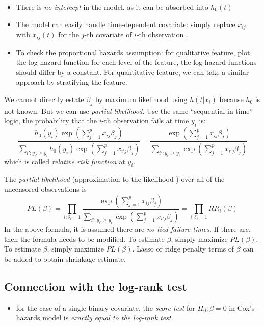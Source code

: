 \documentclass[
  letterpaper,
  DIV=11,
  numbers=noendperiod]{scrreprt}
\providecommand{\tightlist}{%
  \setlength{\itemsep}{0pt}\setlength{\parskip}{0pt}}\usepackage{longtable,booktabs,array}
\begin{document}
\begin{itemize}
\tightlist
\item
  There is \emph{no intercept} in the model, as it can be absorbed into
  \(h_0(t)\)
\item
  The model can easily handle time-dependent covariate: simply replace
  \(x_{ij}\) with \(x_{ij}(t)\) for the \(j\)-th covariate of \(i\)-th
  observation .
\item
  To check the proportional hazards assumption: for qualitative feature,
  plot the log hazard function for each level of the feature, the log
  hazard functions should differ by a constant. For quantitative
  feature, we can take a similar approach by stratifying the feature.
\end{itemize}

We cannot directly estate \(\beta_j\) by maximum likelihood using
\(h(t|x_i)\) because \(h_0\) is not known. But we can use \emph{partial
likelihood}. Use the same ``sequential in time'' logic, the probability
that the \(i\)-th observation fails at time \(y_i\) is: \[
\frac{h_0(y_i)\exp \left(\sum_{j=1}^p x_{ij}\beta_j \right)}{\sum_{i':y_{i'}\ge y_i} h_0(y_i) \exp\left(  \sum_{j=1}^p x_{i'j}\beta_j \right)}=\frac{\exp \left(\sum_{j=1}^p x_{ij}\beta_j \right)}{\sum_{i':y_{i'}\ge y_i} \exp\left(  \sum_{j=1}^p x_{i'j}\beta_j \right)}
\] which is called \emph{relative risk function} at \(y_i\).

The \emph{partial likelihood} (approximation to the likelihood ) over
all of the uncensored observations is \[
PL(\beta) = \prod _{i:\delta_i = 1} \frac{\exp \left(\sum_{j=1}^p x_{ij}\beta_j \right)}{\sum_{i':y_{i'}\ge y_i} \exp\left(  \sum_{j=1}^p x_{i'j}\beta_j \right)} = \prod_{i:\delta_i=1}RR_i(\beta)
\] In the above formula, it is assumed there are \emph{no tied failure
times}. If there are, then the formula needs to be modified. To estimate
\(\beta\), simply maximize \(PL(\beta)\). To estimate \(\beta\), simply
maximize \(PL(\beta)\). Lasso or ridge penalty terms of \(\beta\) can be
added to obtain shrinkage estimate.

\subsection{Connection with the log-rank
test}\label{connection-with-the-log-rank-test}

\begin{itemize}
\tightlist
\item
  for the case of a single binary covariate, the \emph{score test} for
  \(H_0: \beta=0\) in Cox's hazards model is \emph{exactly equal to the
  log-rank test}.
\end{itemize}
\end{document}
